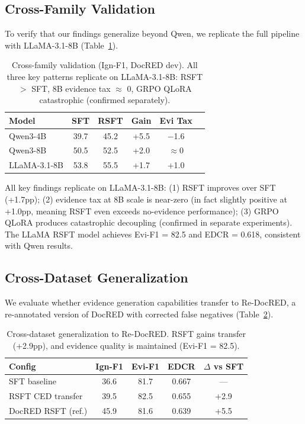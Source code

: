 \documentclass[11pt,a4paper]{article}
\begin{document}
\subsection{Cross-Family Validation}
\label{sec:crossfamily}

To verify that our findings generalize beyond Qwen, we replicate the full pipeline with LLaMA-3.1-8B (Table~\ref{tab:crossfamily}).

\begin{table}[t]
\centering
\small
\begin{tabular}{lccccc}
\toprule
\textbf{Model} & \textbf{SFT} & \textbf{RSFT} & \textbf{Gain} & \textbf{Evi Tax} \\
\midrule
Qwen3-4B & 39.7 & 45.2 & +5.5 & $-$1.6 \\
Qwen3-8B & 50.5 & 52.5 & +2.0 & $\approx$0 \\
LLaMA-3.1-8B & 53.8 & 55.5 & +1.7 & +1.0 \\
\bottomrule
\end{tabular}
\caption{Cross-family validation (Ign-F1, DocRED dev). All three key patterns replicate on LLaMA-3.1-8B: RSFT $>$ SFT, 8B evidence tax $\approx$ 0, GRPO QLoRA catastrophic (confirmed separately).}
\label{tab:crossfamily}
\end{table}

All key findings replicate on LLaMA-3.1-8B:
(1) RSFT improves over SFT (+1.7pp);
(2) evidence tax at 8B scale is near-zero (in fact slightly positive at +1.0pp, meaning RSFT even exceeds no-evidence performance);
(3) GRPO QLoRA produces catastrophic decoupling (confirmed in separate experiments).
The LLaMA RSFT model achieves Evi-F1 = 82.5 and EDCR = 0.618, consistent with Qwen results.

\subsection{Cross-Dataset Generalization}
\label{sec:redocred}

We evaluate whether evidence generation capabilities transfer to Re-DocRED, a re-annotated version of DocRED with corrected false negatives (Table~\ref{tab:redocred}).

\begin{table}[t]
\centering
\small
\begin{tabular}{lcccc}
\toprule
\textbf{Config} & \textbf{Ign-F1} & \textbf{Evi-F1} & \textbf{EDCR} & \textbf{$\Delta$ vs SFT} \\
\midrule
SFT baseline & 36.6 & 81.7 & 0.667 & --- \\
RSFT CED transfer & 39.5 & 82.5 & 0.655 & +2.9 \\
DocRED RSFT (ref.) & 45.9 & 81.6 & 0.639 & +5.5 \\
\bottomrule
\end{tabular}
\caption{Cross-dataset generalization to Re-DocRED. RSFT gains transfer (+2.9pp), and evidence quality is maintained (Evi-F1 = 82.5).}
\label{tab:redocred}
\end{table}
\end{document}

